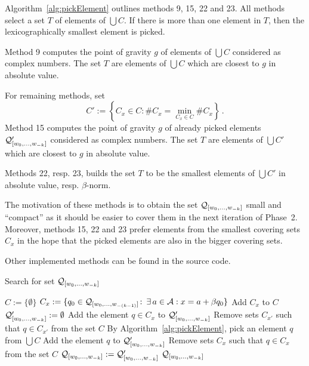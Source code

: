 Algorithm~\ref{alg:pickElement} outlines methods 9, 15, 22 and 23. All methods select a set $T$ of elements of $\bigcup C$. If there is more than one element in $T$, then the lexicographically smallest element is picked.

Method 9 computes the point of gravity $g$ of elements of $\bigcup C$ considered as complex numbers. The set $T$ are elements of  $\bigcup C$ which are closest to $g$ in absolute value. 

For remaining methods, set
$$C':=\left\{C_x \in C \colon \#C_x=\min_{C_x\in C} \#C_x \right\}\,.$$
Method 15 computes the point of gravity $g$ of already picked elements $\mathcal{Q}_{[w_{0}, \dots, w_{-k}]}'$ considered as complex numbers. The set $T$ are elements of  $\bigcup C'$ which are closest to $g$ in absolute value. 

Methods 22, resp. 23, builds the set $T$ to be the smallest elements of  $\bigcup C'$ in absolute value, resp.  $\beta$-norm. 

The motivation of these methods is to obtain the set $\mathcal{Q}_{[w_{0}, \dots, w_{-k}]}$ small and ``compact'' as it should be easier to cover them in the next iteration of Phase~2. Moreover, methods 15, 22 and 23 prefer elements from the smallest covering sets $C_x$ in the hope that the picked elements are also in the bigger covering sets.

Other implemented methods can be found in the source code. 

\begin{algorithm}
  \caption{Search for set $\mathcal{Q}_{[w_{0}, \dots, w_{-k}]}$ }
    \label{alg:minimalSet}
  \begin{algorithmic}[1]
    \STATE $C:=\{\emptyset\}$
    	\STATE $C_x:= \{q_0\in\mathcal{Q}_{[w_{0}, \dots, w_{-(k-1)}]}\colon\, \exists \, a\in\mathcal{A}: x=a+\beta q_0 \}$
        \STATE Add $C_x$ to $C$
    \ENDFOR
    \STATE $\mathcal{Q}_{[w_{0}, \dots, w_{-k}]}':=\emptyset$
    		\STATE Add the element $q\in C_x$ to $\mathcal{Q}_{[w_{0}, \dots, w_{-k}]}'$
	        \STATE Remove sets $C_{x'}$ such that $q \in C_{x'}$  from the set $C$ 
	    \ENDIF
	\ENDFOR
        \STATE By Algorithm~\ref{alg:pickElement},  pick an element $q$ from $\bigcup C$
        \STATE Add the element $q$ to $\mathcal{Q}_{[w_{0}, \dots, w_{-k}]}'$
        \STATE Remove sets $C_x$ such that $q \in C_x$  from the set $C$ 
    \ENDWHILE
	\STATE $\mathcal{Q}_{[w_{0}, \dots, w_{-k}]}:=\mathcal{Q}_{[w_{0}, \dots, w_{-k}]}'$
    \RETURN $\mathcal{Q}_{[w_{0}, \dots, w_{-k}]}$
  \end{algorithmic}
\end{algorithm}


